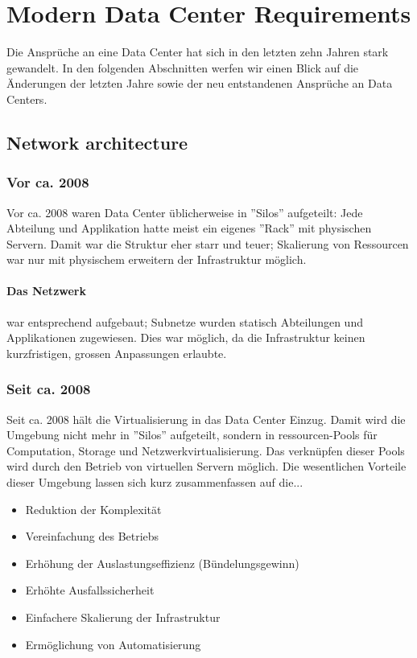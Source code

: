 

\newcommand{\SUBJECT}{Report}
\newcommand{\TITLE}{Cloud Infrastructre Lab 6}



\section{Modern Data Center Requirements}

Die Ansprüche an eine Data Center hat sich in den letzten zehn Jahren stark gewandelt. In den folgenden Abschnitten werfen wir einen Blick auf die Änderungen der letzten Jahre sowie der neu entstandenen Ansprüche an Data Centers.


\subsection{Network architecture}\label{sec:network-architecture}
\subsubsection{Vor ca. 2008}
Vor ca. 2008 waren Data Center üblicherweise in ''Silos'' aufgeteilt: Jede Abteilung und Applikation hatte meist ein eigenes ''Rack'' mit physischen Servern. Damit war die Struktur eher starr und teuer; Skalierung von Ressourcen war nur mit physischem erweitern der Infrastruktur möglich.

\paragraph{Das Netzwerk} war entsprechend aufgebaut; Subnetze wurden statisch Abteilungen und Applikationen zugewiesen. Dies war möglich, da die Infrastruktur keinen kurzfristigen, grossen Anpassungen erlaubte.

\subsubsection{Seit ca. 2008}
Seit ca. 2008 hält die Virtualisierung in das Data Center Einzug. Damit wird die Umgebung nicht mehr in ''Silos'' aufgeteilt, sondern in ressourcen-Pools für Computation, Storage und Netzwerkvirtualisierung. Das verknüpfen dieser Pools wird durch den Betrieb von virtuellen Servern möglich. Die wesentlichen Vorteile dieser Umgebung lassen sich kurz zusammenfassen auf die...
\begin{itemize}
	\item Reduktion der Komplexität
	\item Vereinfachung des Betriebs
	\item Erhöhung der Auslastungseffizienz (Bündelungsgewinn)
	\item Erhöhte Ausfallssicherheit
	\item Einfachere Skalierung der Infrastruktur
	\item Ermöglichung von Automatisierung
\end{itemize}

